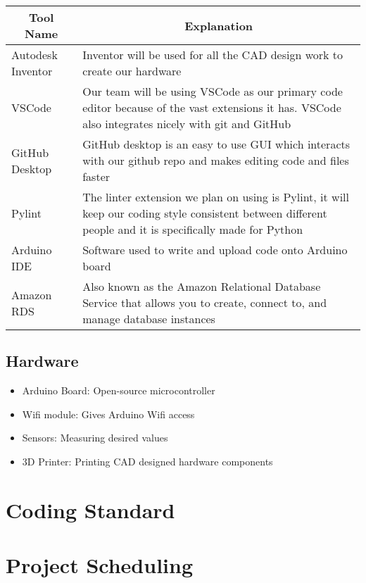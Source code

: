 \documentclass{article}
\begin{document}
\begin{table}[!hbt]
	\centering
	\begin{tabular}{|p{4cm}|p{8cm}|}
	\hline
	\multicolumn{1}{|c|}{\textbf{Tool Name}} & \multicolumn{1}{c|}{\textbf{Explanation}} 
	\\ \hline
	Autodesk Inventor
	&  Inventor will be used for all the CAD design work to create our hardware  
	\newline                              
	\\ \hline
	VSCode
	&  Our team will be using VSCode as our primary code editor because of the vast extensions it has. VSCode also integrates nicely with git and GitHub
	\newline                              
	\\ \hline
	GitHub Desktop
	&  GitHub desktop is an easy to use GUI which interacts with our github repo and makes editing code and files faster
	\newline                              
	\\ \hline
	Pylint
	&  The linter extension we plan on using is Pylint, it will keep our coding style consistent between different people and it is specifically made for Python
	\newline                              
	\\ \hline
	Arduino IDE
	&  Software used to write and upload code onto Arduino board
	\newline                     
	\\ \hline
	Amazon RDS
	&  Also known as the Amazon Relational Database Service that allows you to create, connect to, and manage database instances
	\newline                     
	\\ \hline
	\end{tabular}
\end{table}

\subsection{Hardware}
\begin{itemize}
	\item Arduino Board: Open-source microcontroller 
	\item Wifi module: Gives Arduino Wifi access
	\item Sensors: Measuring desired values
	\item 3D Printer: Printing CAD designed hardware components
\end{itemize}

\section{Coding Standard}

\section{Project Scheduling}

\end{document}
